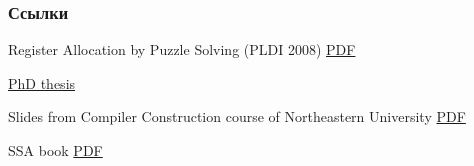 \documentclass[aspectratio=169
  , xcolor={svgnames}
  , hyperref={ colorlinks,citecolor=DeepPink4
             , linkcolor=DarkRed,urlcolor=DarkBlue}
  , russian
  ]{beamer}
\theoremstyle{exerciseStyle1}
\begin{document}
%
%
%


%
%
%  


 \begin{frame}%
   \frametitle<presentation>{Ссылки}
   \begin{thebibliography}{10}
     Register Allocation by Puzzle Solving (PLDI 2008)
     \newblock \href{https://llvm.org/pubs/2008-06-PLDI-PuzzleSolving.pdf}{PDF}
           
     \href{http://compilers.cs.ucla.edu/fernando/publications/papers/PhdDiss.pdf}{PhD thesis}

     Slides from Compiler Construction course of Northeastern University
     \newblock \href{https://users.cs.northwestern.edu/~robby/courses/322-2016-spring/puzzle_solving.pdf}{PDF}

      SSA book
     \href{http://ssabook.gforge.inria.fr/latest/book.pdf}{PDF} 
   \end{thebibliography}
 \end{frame}
\end{document}
